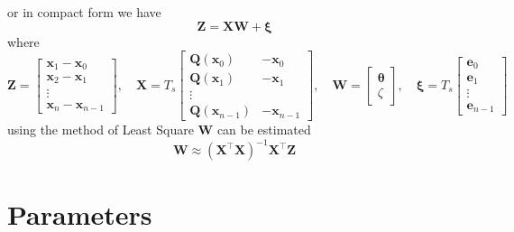 \documentclass[12pt]{iopart}		%
\begin{document}
or in compact form we have
\begin{equation}
 \mathbf Z=\mathbf X \mathbf W+\boldsymbol \xi
\end{equation}
where
\begin{equation}
 \mathbf Z=\left[\begin{array}{cccc} \mathbf x_{1}-\mathbf x_{0}\\
\mathbf x_{2}-\mathbf x_{1}\\\vdots\\
\mathbf x_{n}-\mathbf x_{n-1}\end{array}\right],\quad \mathbf X=T_s\left[\begin{array}{cccc}\mathbf Q(\mathbf x_0)&-\mathbf x_{0}\\
\mathbf Q(\mathbf x_1)&-\mathbf x_{1}\\\vdots\\ \mathbf Q(\mathbf x_{n-1})&-\mathbf x_{n-1}\end{array}\right]
,\quad \mathbf W=\left[\begin{array}{cc} \boldsymbol{\theta} \\ \zeta\end{array}\right],\quad \boldsymbol \xi=T_s\left[\begin{array}{cccc}\mathbf e_0\\\mathbf e_1\\\vdots\\\mathbf e_{n-1}\end{array}\right]
\end{equation}
using the method of Least Square $ \mathbf W$ can be estimated
\begin{equation}
 \mathbf W\approx(\mathbf X^\top\mathbf X)^{-1}\mathbf X^\top\mathbf Z
\end{equation}
\section{Parameters}
\end{document}
